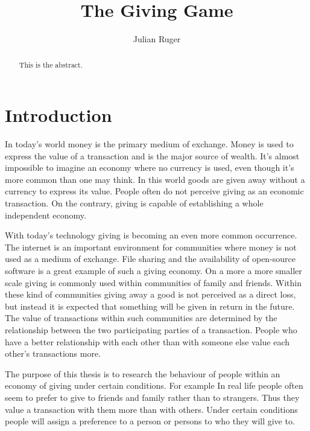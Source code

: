 \documentclass[twoside,openright]{uva-bachelor-thesis}
\title{The Giving Game}
\author{Julian Ruger}
\begin{document}
\maketitle

\begin{abstract}
This is the abstract. 
\end{abstract}

\tableofcontents

\chapter{Introduction}
In today’s world money is the primary medium of exchange. Money is used to express the value of a transaction and is the major source of wealth. It’s almost impossible to imagine an economy where no currency is used, even though it’s more common than one may think. In this world goods are given away without a currency to express its value. People often do not perceive giving as an economic transaction. On the contrary, giving is capable of establishing a whole independent economy. 

With today’s technology giving is becoming an even more common occurrence. The internet is an important environment for communities where money is not used as a medium of exchange. File sharing and the availability of open-source software is a great example of such a giving economy. On a more a more smaller scale giving is commonly used within communities of family and friends. Within these kind of communities giving away a good is not perceived as a direct loss, but instead it is expected that something will be given in return in the future. The value of transactions within such communities are determined by the relationship between the two participating parties of a transaction. People who have a better relationship with each other than with someone else value each other’s transactions more. 

The purpose of this thesis is to research the behaviour of people within an economy of giving under certain conditions. For example In real life people often seem to prefer to give to friends and family rather than to strangers. Thus they value a transaction with them more than with others. Under certain conditions people will assign a preference to a person or persons to who they will give to. 
\end{document}
